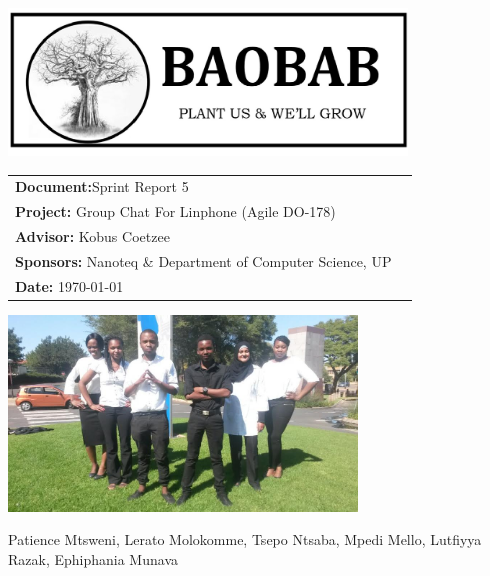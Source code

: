 \begin{titlepage}

\begin{center}

\includegraphics[width=400px]{pictures/logo.jpg}
\vspace{0.5 cm}
\begin{flushright} \large
\begin{tabular}{lr}
\vspace{1 cm}
\LARGE\textbf{Document:}Sprint Report 5\\

\vspace{1 cm}
\LARGE\textbf{Project:} Group Chat For Linphone (Agile DO-178)\\
\vspace{1 cm}
\LARGE\textbf{Advisor:} Kobus Coetzee\\
\vspace{1 cm}
\LARGE\textbf{Sponsors:} Nanoteq \& Department of Computer Science, UP\\
\vspace{1 cm}
\LARGE\textbf{Date: }\today\\
\end{tabular}
\end{flushright}

\centering \includegraphics[width=350px]{pictures/Team.jpg}

Patience Mtsweni, Lerato Molokomme, Tsepo Ntsaba, Mpedi Mello, Lutfiyya Razak, Ephiphania Munava\\


\end{center}
\end{titlepage}